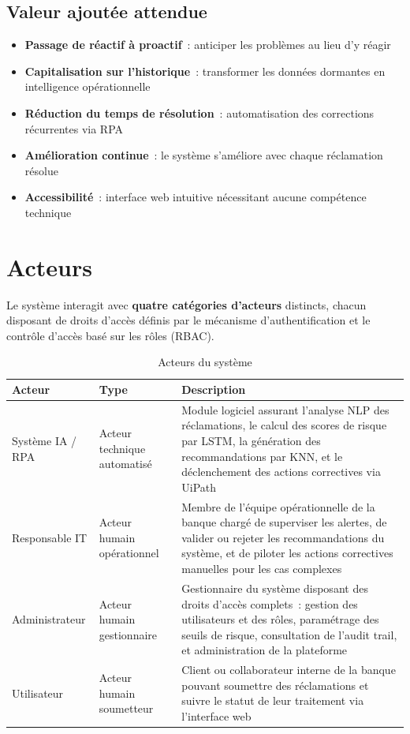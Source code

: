 \documentclass[12pt,a4paper]{report}
\begin{document}
\section{Valeur ajoutée attendue}

\begin{itemize}[noitemsep]
    \item \textbf{Passage de réactif à proactif}~: anticiper les problèmes au lieu d'y réagir
    \item \textbf{Capitalisation sur l'historique}~: transformer les données dormantes en intelligence opérationnelle
    \item \textbf{Réduction du temps de résolution}~: automatisation des corrections récurrentes via RPA
    \item \textbf{Amélioration continue}~: le système s'améliore avec chaque réclamation résolue
    \item \textbf{Accessibilité}~: interface web intuitive nécessitant aucune compétence technique
\end{itemize}


\chapter{Acteurs}

Le système interagit avec \textbf{quatre catégories d'acteurs} distincts, chacun disposant de droits d'accès définis par le mécanisme d'authentification et le contrôle d'accès basé sur les rôles (RBAC).

\begin{table}[H]
\centering
\caption{Acteurs du système}
\begin{tabularx}{\textwidth}{|l|l|X|}
\hline
\textbf{Acteur} & \textbf{Type} & \textbf{Description} \\
\hline
Système IA / RPA & Acteur technique automatisé & Module logiciel assurant l'analyse NLP des réclamations, le calcul des scores de risque par LSTM, la génération des recommandations par KNN, et le déclenchement des actions correctives via UiPath \\
\hline
Responsable IT & Acteur humain opérationnel & Membre de l'équipe opérationnelle de la banque chargé de superviser les alertes, de valider ou rejeter les recommandations du système, et de piloter les actions correctives manuelles pour les cas complexes \\
\hline
Administrateur & Acteur humain gestionnaire & Gestionnaire du système disposant des droits d'accès complets~: gestion des utilisateurs et des rôles, paramétrage des seuils de risque, consultation de l'audit trail, et administration de la plateforme \\
\hline
Utilisateur & Acteur humain soumetteur & Client ou collaborateur interne de la banque pouvant soumettre des réclamations et suivre le statut de leur traitement via l'interface web \\
\hline
\end{tabularx}
\end{table}
\end{document}
